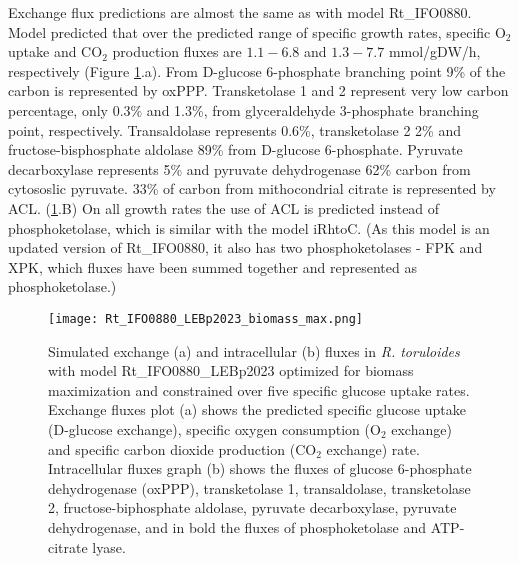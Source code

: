 Exchange flux predictions are almost the same as with model Rt\_IFO0880. Model predicted that over the predicted range of specific growth rates, specific O$_2$ uptake and CO$_2$ production fluxes are $1.1-6.8$ and $1.3-7.7$ \unit{mmol/gDW/h}, respectively (Figure \ref{fig:Rt_IFO0880_LEBp2023_biomass_max}.a).
From D-glucose 6-phosphate branching point 9\% of the carbon is represented by oxPPP. 
Transketolase 1 and 2 represent very
low carbon percentage, only 0.3\% and 1.3\%, from glyceraldehyde 3-phosphate branching point, respectively. Transaldolase represents
0.6\%, transketolase 2 2\% and fructose-bisphosphate aldolase 89\% from D-glucose 6-phosphate. Pyruvate decarboxylase represents 5\% 
and pyruvate dehydrogenase 62\% carbon from cytososlic pyruvate. %
33\% of carbon from mithocondrial citrate is represented by ACL. (\ref{fig:Rt_IFO0880_LEBp2023_biomass_max}.B)
On all growth rates the use of ACL is predicted instead of phosphoketolase, which is similar with the model iRhtoC. 
(As this model is an updated version of Rt\_IFO0880, it also has two phosphoketolases - FPK and XPK, which fluxes
have been summed together and represented as phosphoketolase.) 
\begin{figure}[H]
    \centering
    \texttt{[image: Rt\_IFO0880\_LEBp2023\_biomass\_max.png]}
    \caption{Simulated exchange (a) and intracellular (b) fluxes in \textit{R. toruloides} with model Rt\_IFO0880\_LEBp2023 optimized for biomass maximization and constrained over five specific glucose uptake rates. Exchange fluxes plot (a) shows the predicted specific glucose uptake (D-glucose exchange), specific oxygen consumption (O$_2$ exchange) and specific carbon dioxide production (CO$_2$ exchange) rate. Intracellular fluxes graph (b) shows the fluxes of glucose 6-phosphate dehydrogenase (oxPPP), transketolase 1, transaldolase, transketolase 2, fructose-biphosphate aldolase, pyruvate decarboxylase, pyruvate dehydrogenase, and in bold the fluxes of phosphoketolase and ATP-citrate lyase.}
    \label{fig:Rt_IFO0880_LEBp2023_biomass_max}
\end{figure}

